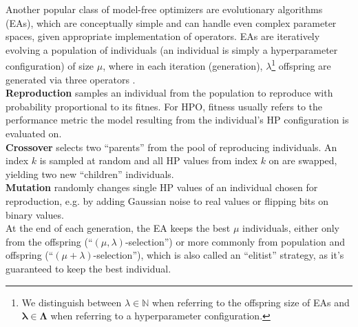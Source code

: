 \documentclass[twoside,11pt]{article}
\begin{document}
Another popular class of model-free optimizers are evolutionary algorithms (EAs), which are conceptually simple and can handle even complex parameter spaces,
given appropriate implementation of operators.
EAs are iteratively evolving a population of individuals (an individual is simply a hyperparameter configuration) of size $\mu$, where in each iteration (generation),
$\lambda$\footnote{We distinguish between $\lambda\in\mathbb{N}$ when referring to the offspring size of EAs and $\boldsymbol\lambda\in\boldsymbol\Lambda$ when
referring to a hyperparameter configuration.} offspring are generated via three operators \citep[pp. 10-TODO]{genetic_algos}.\\
\textbf{Reproduction} samples an individual from the population to reproduce with probability proportional to its fitnes. For HPO, fitness usually refers to the
performance metric the model resulting from the individual's HP configuration is evaluated on.\\
\textbf{Crossover} selects two ``parents'' from the pool of reproducing individuals. An index $k$ is sampled at random and all HP values from
index $k$ on are swapped, yielding two new ``children'' individuals.\\
\textbf{Mutation} randomly changes single HP values of an individual chosen for reproduction, e.g. by adding Gaussian noise to real values or flipping bits
on binary values.\\
At the end of each generation, the EA keeps the best $\mu$ individuals, either only from the offspring (``$(\mu,\lambda)$-selection'') or more commonly from
population and offspring (``$(\mu+\lambda)$-selection''), which is also called an ``elitist'' strategy, as it's guaranteed to keep the best individual.
\citep[chap. 1.3]{feurer_hyperparameter_2019}
\end{document}
